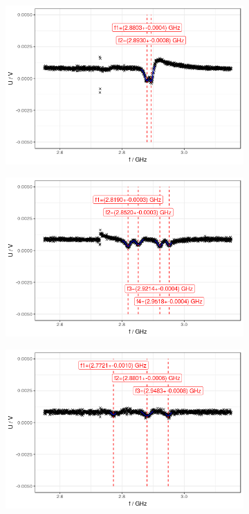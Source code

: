 \begin{figure}
	\begin{subfigure}{0.5\textwidth}
		\includegraphics[width=\textwidth]{../figures/odmr-bx.png}
		\label{fig:odmr-magnet-x}
	\end{subfigure}
	\begin{subfigure}{0.5\textwidth}
		\includegraphics[width=\textwidth]{../figures/odmr-by.png}
		\label{fig:odmr-magnet-y}
	\end{subfigure}
	\begin{subfigure}{0.5\textwidth}
		\includegraphics[width=\textwidth]{../figures/odmr-bz.png}

\end{subfigure}
\end{figure}
